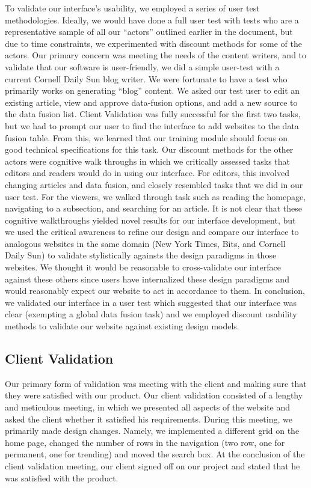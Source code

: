 \documentclass[11pt]{article} %
\begin{document}
To validate our interface’s usability, we employed a series of user test methodologies. Ideally, we would have done a full user test with tests who are a representative sample of all our “actors” outlined earlier in the document, but due to time constraints, we experimented with discount methods for some of the actors. Our primary concern was meeting the needs of the content writers, and to validate that our software is user-friendly, we did a simple user-test with a current Cornell Daily Sun blog writer. We were fortunate to have a test who primarily works on generating “blog” content. We asked our test user to edit an existing article, view and approve data-fusion options, and add a new source to the data fusion list. Client Validation was fully successful for the first two tasks, but we had to prompt our user to find the interface to add websites to the data fusion table. From this, we learned that our training module should focus on good technical specifications for this task. Our discount methods for the other actors were cognitive walk throughs in which we critically assessed tasks that editors and readers would do in using our interface. For editors, this involved changing articles and data fusion, and closely resembled tasks that we did in our user test. For the viewers, we walked through task such as reading the homepage, navigating to a subsection, and searching for an article. It is not clear that these cognitive walkthroughs yielded novel results for our interface development, but we used the critical awareness to refine our design and compare our interface to analogous websites in the same domain (New York Times, Bits, and Cornell Daily Sun) to validate stylistically againsts the design paradigms in those websites. We thought it would be reasonable to cross-validate our interface against these others since users have internalized these design paradigms and would reasonably expect our website to act in accordance to them. In conclusion, we validated our interface in a user test which suggested that our interface was clear (exempting a global data fusion task) and we employed discount usability methods to validate our website against existing design models.

\subsection{Client Validation}

Our primary form of validation was meeting with the client and making sure that they were satisfied with our product. Our client validation consisted of a lengthy and meticulous meeting, in which we presented all aspects of the website and asked the client whether it satisfied his requirements. During this meeting, we primarily made design changes. Namely, we implemented a different grid on the home page, changed the number of rows in the navigation (two row, one for permanent, one for trending) and moved the search box. At the conclusion of the client validation meeting, our client signed off on our project and stated that he was satisfied with the product. 
\end{document}

